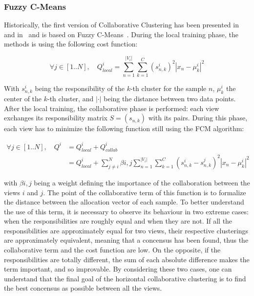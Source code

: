     \subsubsection{Fuzzy C-Means}

    Historically, the first version of Collaborative Clustering has been presented in~\cite{grozavu2010topological} and in~\cite{pedrycz2004fuzzy} and is based on Fuzzy C-Means~\cite{bezdek1984fcm}. During the local training phase, the methods is using the following cost function:

    \begin{equation}
    \forall j \in [1..N], \quad Q^i_{local} = \sum_{n=1}^{|V_i|}\sum_{k=1}^C{(s_{n,k}^i)}^2|x_n - \mu_k^i|^2
        \label{eq:local_fcm}
    \end{equation}

    With $s_{n,k}^i$ being the responsibility of the $k$-th cluster for the sample $n$, $\mu_k^i$ the center of the $k$-th cluster, and $|\cdot|$ being the distance between two data points. After the local training, the collaborative phase is performed: each view exchanges its responsibility matrix $S = (s_{n,k})$ with its pairs. During this phase, each view has to minimize the following function still using the FCM algorithm:

    \begin{align}
        \forall j \in [1..N], \quad Q^i &= Q^i_{local} + Q^i_{collab}\\
    &= Q^i_{local} + \sum_{j\neq i}^N \beta{i,j}\sum_{n=1}^{|V_i|}\sum_{k=1}^C{(s_{n,k}^i - s_{n,k}^j)}^2|x_n-\mu_k^i|^2
    \end{align}
    
    with $\beta{i,j}$ being a weight defining the importance of the collaboration between the views $i$ and $j$. The point of the collaborative term of this function is to formalize the distance between the allocation vector of each sample. To better understand the use of this term, it is necessary to observe its behaviour in two extreme cases: when the responsibilities are roughly equal and when they are not. If all the responsibilities are approximately equal for two views, their respective clusterings are approximately equivalent, meaning that a concensus has been found, thus the collaborative term and the cost function are low. On the opposite, if the responsibilities are totally different, the sum of each absolute difference makes the term important, and so improvable. By considering these two cases, one can understand that the final goal of the horizontal collaborative clustering is to find the best concensus as possible between all the views.

